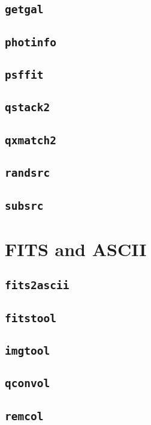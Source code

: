 \documentclass[12pt,a4paper]{report}
\begin{document}
\subsection{\texttt{getgal}} 
\subsection{\texttt{photinfo}} 
\subsection{\texttt{psffit}} 
\subsection{\texttt{qstack2}} 
\subsection{\texttt{qxmatch2}} 
\subsection{\texttt{randsrc}} 
\subsection{\texttt{subsrc}} 

\section{FITS and ASCII \label{SEC:tool:fits}}
\subsection{\texttt{fits2ascii}} 
\subsection{\texttt{fitstool}} 
\subsection{\texttt{imgtool}} 
\subsection{\texttt{qconvol}} 
\subsection{\texttt{remcol}} 


\printindex
\end{document}

